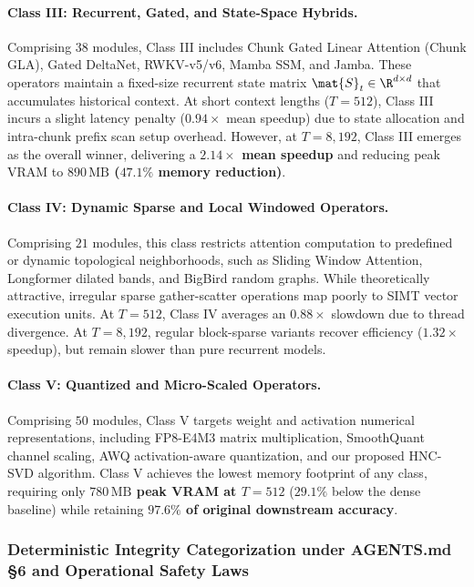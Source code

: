 \paragraph{Class III: Recurrent, Gated, and State-Space Hybrids.}
Comprising $38$ modules, Class III includes Chunk Gated Linear Attention (Chunk GLA), Gated DeltaNet, RWKV-v5/v6, Mamba SSM, and Jamba. These operators maintain a fixed-size recurrent state matrix $\mat{S}_t \in \R^{d \times d}$ that accumulates historical context. At short context lengths ($T=512$), Class III incurs a slight latency penalty ($0.94\times$ mean speedup) due to state allocation and intra-chunk prefix scan setup overhead. However, at $T=8{,}192$, Class III emerges as the overall winner, delivering a \textbf{$2.14\times$ mean speedup} and reducing peak VRAM to \textbf{$890\,\text{MB}$ ($47.1\%$ memory reduction)}.

\paragraph{Class IV: Dynamic Sparse and Local Windowed Operators.}
Comprising $21$ modules, this class restricts attention computation to predefined or dynamic topological neighborhoods, such as Sliding Window Attention, Longformer dilated bands, and BigBird random graphs. While theoretically attractive, irregular sparse gather-scatter operations map poorly to SIMT vector execution units. At $T=512$, Class IV averages an $0.88\times$ slowdown due to thread divergence. At $T=8{,}192$, regular block-sparse variants recover efficiency ($1.32\times$ speedup), but remain slower than pure recurrent models.

\paragraph{Class V: Quantized and Micro-Scaled Operators.}
Comprising $50$ modules, Class V targets weight and activation numerical representations, including FP8-E4M3 matrix multiplication, SmoothQuant channel scaling, AWQ activation-aware quantization, and our proposed HNC-SVD algorithm. Class V achieves the lowest memory footprint of any class, requiring only \textbf{$780\,\text{MB}$ peak VRAM at $T=512$} ($29.1\%$ below the dense baseline) while retaining \textbf{$97.6\%$ of original downstream accuracy}.

\subsubsection{Deterministic Integrity Categorization under AGENTS.md §6 and Operational Safety Laws}
\label{sec:results_integrity_groups}


